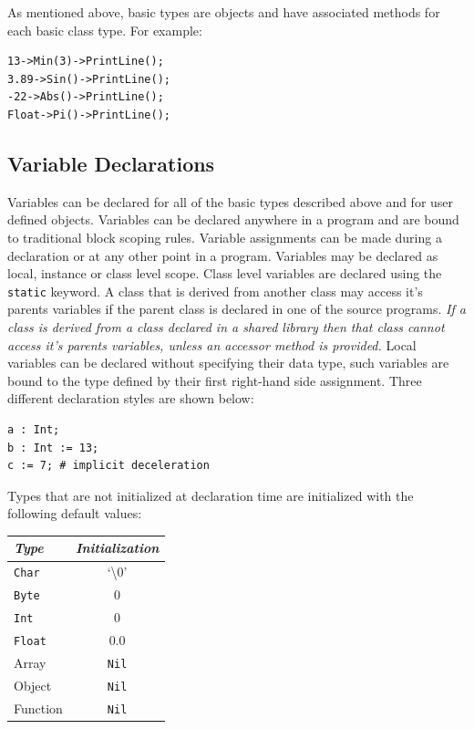 \documentclass[11pt]{article}
\begin{document}
As mentioned above, basic types are objects and have associated
methods for each basic class type.  For example:

\begin{verbatim}
13->Min(3)->PrintLine();
3.89->Sin()->PrintLine();
-22->Abs()->PrintLine();
Float->Pi()->PrintLine();
\end{verbatim}

\subsection{Variable Declarations}
Variables can be declared for all of the basic types described above
and for user defined objects. Variables can be declared anywhere in a
program and are bound to traditional block scoping rules.  Variable
assignments can be made during a declaration or at any other point in
a program. Variables may be declared as local, instance or class
level scope.  Class level variables are declared using the
\texttt{static} keyword. A class that is derived from another class
may access it's parents variables if the parent class is declared in
one of the source programs.  \textit{If a class is derived from a
  class declared in a shared library then that class cannot access
  it's parents variables, unless an accessor method is provided.}
Local variables can be declared without specifying their data type,
such variables are bound to the type defined by their first right-hand
side assignment. Three different declaration styles are shown below:

\begin{verbatim}
a : Int;
b : Int := 13;
c := 7; # implicit deceleration 
\end{verbatim}

Types that are not initialized at declaration time are initialized
with the following default values:

\vspace{\baselineskip}
\begin{center}
  \begin{tabular}{| l | c |}
    \hline
    \emph{Type} & \emph{Initialization} \\ \hline \hline
    \texttt{Char} & `\textbackslash0' \\ \hline
    \texttt{Byte} & 0 \\ \hline
    \texttt{Int} & 0 \\ \hline
    \texttt{Float} & 0.0 \\ \hline
    Array & \texttt{Nil} \\ \hline
    Object & \texttt{Nil} \\ \hline
    Function & \texttt{Nil} \\ \hline
  \end{tabular}
\end{center}
\end{document}
